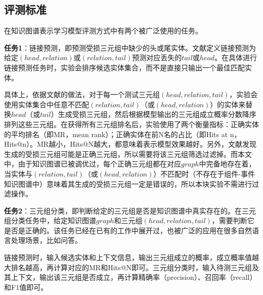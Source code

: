 \subsection{评测标准}
在知识图谱表示学习模型评测方式中有两个被广泛使用的任务。

\textbf{任务1}：链接预测，即预测受损三元组中缺少的头或尾实体。文献\parencite{bordes2011learning,bordes2013translatingE}定义链接预测为给定$(head,relation)$或$(relation,tail)$预测对应丢失的$tail$或$head$。在具体进行链接预测任务时，实验会排序候选实体集合，而不是直接只输出一个最佳匹配实体。

具体上，依据文献\parencite{bordes2013translatingE}的做法，对于每一个测试三元组$(head,relation,tail)$，实验会使用实体集合中任意不匹配$(relation,tail)$（或$(head,relation)$）的实体来替换$head$（或$tail$）生成受损三元组，然后根据模型输出的三元组成立概率分数降序排列这些三元组。在获得所有三元组排名后，实验使用了两个衡量指标：正确实体的平均排名（即MR，mean rank）；正确实体在前N名的占比（即Hits at n，Hits@n）。MR越小，Hits@N越大，都意味着表示模型效果越好。另外，文献\parencite{bordes2013translatingE}发现生成的受损三元组可能是正确三元组，所以需要将该三元组筛选过滤掉。而本文中，由于知识图谱已被调优过，每个正确三元组都在对应$graph$中完备地存在着，当实体与$(relation,tail)$（或$(head,relation)$）不匹配时（不存在于组件-事件知识图谱中）意味着其生成的受损三元组一定是错误的，所以本块实验不需进行过滤操作。

\textbf{任务2}：三元组分类，即判断给定的三元组是否是知识图谱中真实存在的。在三元组分类任务中，给定知识图谱$graph$和三元组$(head,relation,tail)$，需要判断它是否是正确的。该任务已经在已有的工作\parencite{bordes2013translatingE,wang2014knowledge,lin2015learning}中展开过，也被广泛的应用在很多自然语言处理场景，比如问答。

链接预测时，输入候选实体和上下文信息，输出三元组成立的概率，成立概率值越大排名越高，再计算对应的MR和Hits@N即可。三元组分类时，输入待测三元组及其上下文，输出该三元组是否成立，再计算精确率（precision）、召回率（recall）和F1值即可。



